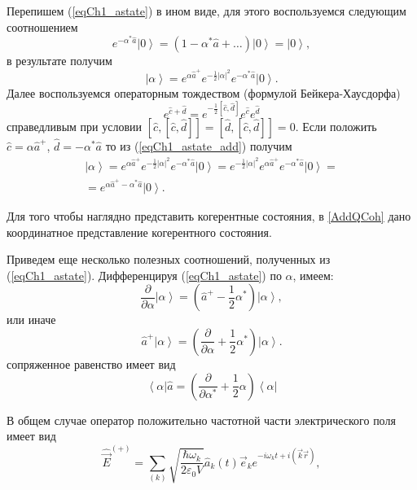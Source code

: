 Перепишем (\ref{eqCh1_astate}) в ином виде, для этого воспользуемся
следующим соотношением
\[
e^{- \alpha^{*} \hat{a}} \left|0\right> = \left(1 - \alpha^{*} \hat{a} +
\dots\right) \left|0\right> = \left|0\right>,
\]
в результате получим
\begin{equation}
\left|\alpha\right> = 
e^{\alpha \hat{a}^{+}} 
e^{-\frac{1}{2}\left|\alpha\right|^2}
e^{- \alpha^{*} \hat{a}} 
\left|0\right>.
\label{eqCh1_astate_add}
\end{equation}
Далее воспользуемся операторным тождеством (формулой Бейкера-Хаусдорфа)
\begin{equation}
e^{\hat{c} + \hat{d}} = e^{- \frac{1}{2}\left[\hat{c},
    \hat{d}\right]}e^{\hat{c}} e^{\hat{d}} 
\label{eqPart1Ch1_BeikerHausdorf}
\end{equation}
справедливым при условии  
$\left[\hat{c},\left[\hat{c}, \hat{d}\right]\right] =
\left[\hat{d},\left[\hat{c}, \hat{d}\right]\right] = 0$.
Если положить $\hat{c} = \alpha\hat{a}^{+}$, $\hat{d} = -\alpha^*\hat{a}$
то из (\ref{eqCh1_astate_add})  получим 
\begin{eqnarray}
\left|\alpha\right> =  
e^{\alpha \hat{a}^{+}} 
e^{-\frac{1}{2}\left|\alpha\right|^2}
e^{- \alpha^{*} \hat{a}} 
\left|0\right> =
e^{-\frac{1}{2}\left|\alpha\right|^2}
e^{\alpha \hat{a}^{+}} 
e^{- \alpha^{*} \hat{a}} 
\left|0\right> = 
\nonumber \\
=
e^{\alpha \hat{a}^{+} - \alpha^{*} \hat{a}}\left|0\right>.
\label{eqCh1_astate4squeezed}
\end{eqnarray}

Для того чтобы наглядно представить когерентные состояния, в
\autoref{AddQCoh} дано координатное представление когерентного состояния. 

Приведем еще несколько полезных соотношений, полученных из
(\ref{eqCh1_astate}). Дифференцируя (\ref{eqCh1_astate}) по  $\alpha$,
имеем:  
\[
\frac{\partial}{\partial \alpha}\left|\alpha\right> = 
\left( \hat{a}^{+} - \frac{1}{2}\alpha^{*}\right)\left|\alpha\right>,
\]
или иначе 
\[
\hat{a}^{+}\left|\alpha\right> = \left(\frac{\partial}{\partial
  \alpha} +  \frac{1}{2}\alpha^{*}\right)\left|\alpha\right>.
\]
сопряженное равенство имеет вид
\[
\left<\alpha\right|\hat{a} = \left(\frac{\partial}{\partial
  \alpha^{*}} +  \frac{1}{2}\alpha\right)\left<\alpha\right|
\]

В общем случае оператор положительно частотной части электрического поля имеет вид
\[
\hat{\vec{E}}^{(+)} = \sum_{(k)} \sqrt{\frac{\hbar \omega_k}{2 \varepsilon_0
V}} \hat{a}_k\left(t\right) \vec{e}_k e^{-i \omega_k t + i \left(\vec{k}\vec{r}
  \right)}, 
\]

